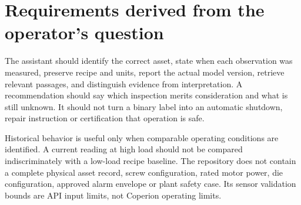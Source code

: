 \section{Requirements derived from the operator's question}
The assistant should identify the correct asset, state when each observation was measured, preserve recipe and units, report the actual model version, retrieve relevant passages, and distinguish evidence from interpretation. A recommendation should say which inspection merits consideration and what is still unknown. It should not turn a binary label into an automatic shutdown, repair instruction or certification that operation is safe.

Historical behavior is useful only when comparable operating conditions are identified. A current reading at high load should not be compared indiscriminately with a low-load recipe baseline. The repository does not contain a complete physical asset record, screw configuration, rated motor power, die configuration, approved alarm envelope or plant safety case. Its sensor validation bounds are API input limits, not Coperion operating limits.
